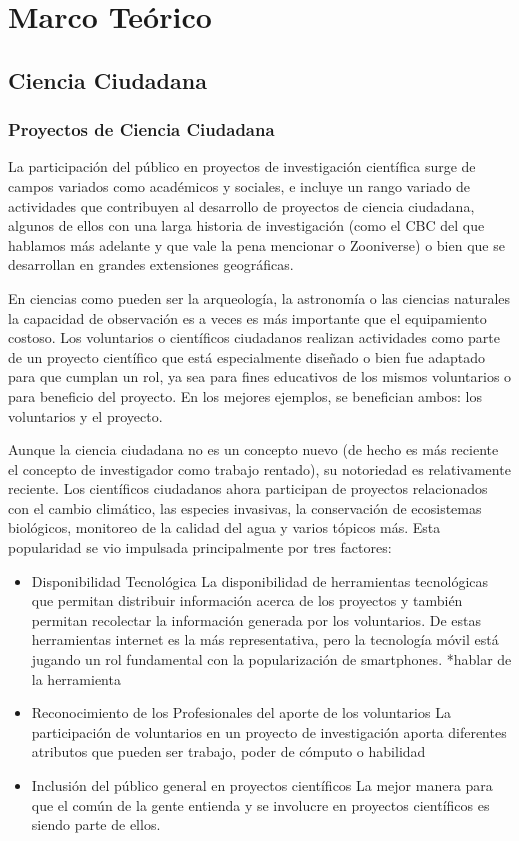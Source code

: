 \chapter{Marco Teórico}
\section{Ciencia Ciudadana}
		
	
\subsection{Proyectos de Ciencia Ciudadana}

	La participación del público en proyectos de investigación científica surge de campos variados como académicos y sociales, e incluye un rango variado de actividades que contribuyen al desarrollo de proyectos de ciencia ciudadana, algunos de ellos con una larga historia de investigación (como el CBC del que hablamos más adelante y que vale la pena mencionar o Zooniverse) o bien que se desarrollan en grandes extensiones geográficas. \citep{shirk2012public} 

	En ciencias como pueden ser la arqueología, la astronomía o las ciencias naturales la capacidad de observación es a veces es más importante que el equipamiento costoso. Los voluntarios o científicos ciudadanos realizan actividades como parte de un proyecto científico que está especialmente diseñado o bien fue adaptado para que cumplan un rol, ya sea para fines educativos de los mismos voluntarios o para beneficio del proyecto. En los mejores ejemplos, se benefician ambos: los voluntarios y el proyecto.\cite{silvertown2009new}
		
	Aunque la ciencia ciudadana no es un concepto nuevo (de hecho es más reciente el concepto de investigador como trabajo rentado), su notoriedad es relativamente reciente. Los científicos ciudadanos ahora participan de proyectos relacionados con el cambio climático, las especies invasivas, la conservación de ecosistemas biológicos, monitoreo de la calidad del agua y varios tópicos más. Esta popularidad se vio impulsada principalmente por tres factores:

\begin{itemize}
	\item {Disponibilidad Tecnológica}
	La disponibilidad de herramientas tecnológicas que permitan distribuir información acerca de los proyectos y también permitan recolectar la información generada por los voluntarios. De estas herramientas internet es la más representativa, pero la tecnología móvil está jugando un rol fundamental con la popularización de smartphones. \citep{silvertown2009new}
	*hablar de la herramienta 
	\item {Reconocimiento de los Profesionales del aporte de los voluntarios}
	La participación de voluntarios en un proyecto de investigación aporta diferentes atributos que pueden ser trabajo, poder de cómputo o habilidad \cite{cohn2008citizen}
	\item {Inclusión del público general en proyectos científicos}
	La mejor manera para que el común de la gente entienda y se involucre en proyectos científicos es siendo parte de ellos. \citep{silvertown2009new}
\end{itemize} 


